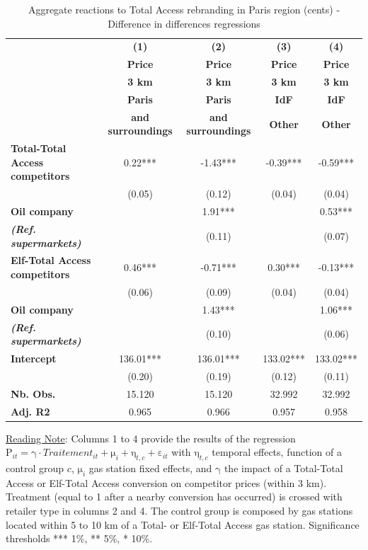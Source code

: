 \documentclass[english]{article}
\begin{document}
\begin{table}
\caption{Aggregate reactions to Total Access rebranding in Paris region (cents) - Difference in differences regressions}
\label{tab:paris_comp_reaction_dd_regs}
\begin{threeparttable}
\begin{footnotesize}
\begin{tabular}{l|cccc}
\hline
\hline
 & \textbf{(1)}  & \textbf{(2)}  & \textbf{(3)}  & \textbf{(4) }\tabularnewline
 & \textbf{Price}  & \textbf{Price}  & \textbf{Price}  & \textbf{Price}\tabularnewline
 & \textbf{3 km}  & \textbf{3 km}  & \textbf{3 km}  & \textbf{3 km}\tabularnewline
\hline
 & \textbf{Paris}  & \textbf{Paris}  & \textbf{IdF}  & \textbf{IdF}\tabularnewline
 & \textbf{and surroundings}  & \textbf{and surroundings}  & \textbf{Other}  & \textbf{Other}\tabularnewline
\hline
\textbf{Total-Total Access competitors}  & 0.22{*}{*}{*}  & -1.43{*}{*}{*}  & -0.39{*}{*}{*}  & -0.59{*}{*}{*}\tabularnewline
 & (0.05)  & (0.12)  & (0.04)  & (0.04)\tabularnewline
\textbf{Oil company}  &  & 1.91{*}{*}{*}  &  & 0.53{*}{*}{*}\tabularnewline
\textbf{\textit{(Ref. supermarkets)}}  &  & (0.11)  &  & (0.07)\tabularnewline
\hline
\textbf{Elf-Total Access competitors}  & 0.46{*}{*}{*}  & -0.71{*}{*}{*}  & 0.30{*}{*}{*}  & -0.13{*}{*}{*}\tabularnewline
 & (0.06)  & (0.09)  & (0.04)  & (0.04)\tabularnewline
\textbf{Oil company}  &  & 1.43{*}{*}{*}  &  & 1.06{*}{*}{*}\tabularnewline
\textbf{\textit{(Ref. supermarkets)}}  &  & (0.10)  &  & (0.06)\tabularnewline
\hline
\textbf{Intercept}  & 136.01{*}{*}{*}  & 136.01{*}{*}{*}  & 133.02{*}{*}{*}  & 133.02{*}{*}{*}\tabularnewline
 & (0.20)  & (0.19)  & (0.12)  & (0.11)\tabularnewline
\hline
\textbf{Nb. Obs.}  & 15.120  & 15.120  & 32.992  & 32.992\tabularnewline
\textbf{Adj. R2}  & 0.965  & 0.966  & 0.957  & 0.958\tabularnewline
\hline
\hline
\end{tabular}
\end{footnotesize}
\end{threeparttable}
\parbox{\textwidth}{\small%
\vspace{2eX} %
{\small{}\uline{Reading Note}}{\small{}: } Columns 1 to 4 provide the results of the regression $\mathrm{P}_{it}=\mathrm{\gamma}\cdot Traitement_{it}+\mathrm{\mu}_{i}+\mathrm{\eta}_{t,c}+\mathrm{\varepsilon}_{it}$
with $\mathrm{\eta}_{t,c}$ temporal effects, function of a control group $c$, $\mathrm{\mu}_{i}$ gas station fixed effects, and $\mathrm{\gamma}$ the impact of a Total-Total Access or Elf-Total Access conversion on competitor prices (within 3 km). Treatment (equal to 1 after a nearby conversion has occurred) is crossed with retailer type in columns 2 and 4. The control group is composed by gas stations located within 5 to 10 km of a Total- or Elf-Total Access gas station. Significance thresholds {*}{*}{*} 1\%, {*}{*} 5\%, {*} 10\%.}
\end{table}
\end{document}
